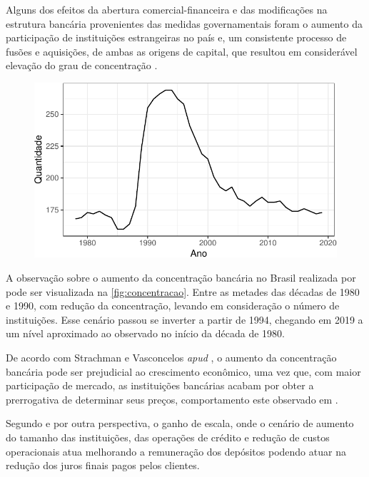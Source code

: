 \documentclass[12pt,openright,oneside,a4paper,chapter=TITLE,section=TITLE,subsection=TITLE,english,french,spanish,portugues,sumario=tradicional]{04-class-files/abntex2}
\begin{document}
Alguns dos efeitos da abertura comercial-financeira e das modificações na
estrutura bancária provenientes das medidas governamentais foram o aumento da
participação de instituições estrangeiras no país e, um consistente processo de
fusões e aquisições, de ambas as origens de capital, que resultou em
considerável elevação do grau de concentração \cite{camargo:2009}.

\begin{figure}

\begin{center}\includegraphics{12-exportedfigures/concetration-1} \end{center}
\label{fig:concentracao}
\end{figure}

A observação sobre o aumento da concentração bancária no Brasil realizada por
\textcite{camargo:2009} pode ser visualizada na \autoref{fig:concentracao}.
Entre as metades das décadas de 1980 e 1990, com redução da concentração,
levando em consideração o número de instituições. Esse cenário passou se
inverter a partir de 1994, chegando em 2019 a um nível aproximado ao observado
no início da década de 1980.

De acordo com Strachman e Vasconcelos \emph{apud} \textcite{camargo:2009}, o aumento
da concentração bancária pode ser prejudicial ao crescimento econômico, uma vez
que, com maior participação de mercado, as instituições bancárias acabam por
obter a prerrogativa de determinar seus preços, comportamento este observado em
\textcite{klein:1971}.

Segundo \textcite{camargo:2009} e \textcite{dantas:2012} por outra perspectiva,
o ganho de escala, onde o cenário de aumento do tamanho das instituições, das
operações de crédito e redução de custos operacionais atua melhorando a
remuneração dos depósitos podendo atuar na redução dos juros finais pagos pelos
clientes.
\end{document}
